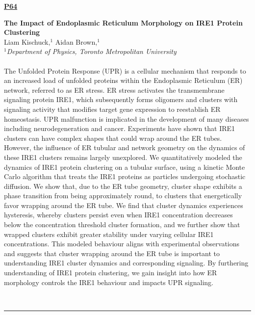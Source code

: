 \documentclass[titlepage,oneside,openany,10pt]{book}
\newenvironment{posterabs}[4] %
        {
	\begin{flushright}
                \underline{\textbf{#4}}
        \end{flushright}
        \textbf{#1}\\%
        #2\\%
        \textit{#3}\\\\%
        }
        {
        \\
        \noindent\rule{15cm}{0.5pt}%
        }
\begin{document}

\newpage

\begin{posterabs}
	{The Impact of Endoplasmic Reticulum Morphology on IRE1 Protein Clustering}
	{Liam Kischuck,$^{1}$ Aidan Brown,$^{1}$}
	{
	$^1$Department of Physics, Toronto Metropolitan University
	}
	{P64}
	The Unfolded Protein Response (UPR) is a cellular mechanism that responds to an increased load of unfolded proteins within the Endoplasmic Reticulum (ER) network, referred to as ER stress. ER stress activates the transmembrane signaling protein IRE1, which subsequently forms oligomers and clusters with signaling activity that modifies target gene expression to reestablish ER homeostasis. UPR malfunction is implicated in the development of many diseases including neurodegeneration and cancer. Experiments have shown that IRE1 clusters can have complex shapes that could wrap around the ER tubes. However, the influence of ER tubular and network geometry on the dynamics of these IRE1 clusters remains largely unexplored. We quantitatively modeled the dynamics of IRE1 protein clustering on a tubular surface, using a kinetic Monte Carlo algorithm that treats the IRE1 proteins as particles undergoing stochastic diffusion. We show that, due to the ER tube geometry, cluster shape exhibits a phase transition from being approximately round, to clusters that energetically favor wrapping around the ER tube. We find that cluster dynamics experiences hysteresis, whereby clusters persist even when IRE1 concentration decreases below the concentration threshold cluster formation, and we further show that wrapped clusters exhibit greater stability under varying cellular IRE1 concentrations. This modeled behaviour aligns with experimental observations and suggests that cluster wrapping around the ER tube is important to understanding IRE1 cluster dynamics and corresponding signaling. By furthering understanding of IRE1 protein clustering, we gain insight into how ER morphology controls the IRE1 behaviour and impacts UPR signaling.
	\label{KischuckL}
\end{posterabs}

\vspace{1cm}
\end{document}
